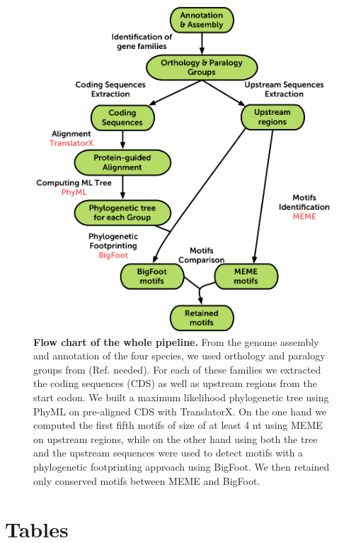 \documentclass[10pt]{article}
\begin{document}
\begin{figure}[!ht]
\begin{center}
\includegraphics{Figures/Pipeline.png}
\end{center}
\caption{
{\bf Flow chart of the whole pipeline.}  From the genome assembly and annotation of the four species, we used orthology and paralogy groups from (Ref. needed). For each of these families we extracted the coding sequences (CDS) as well as upstream regions from the start codon. We built a maximum likelihood phylogenetic tree using PhyML on pre-aligned CDS with TranslatorX. On the one hand we computed the first fifth motifs of size of at least 4 nt using MEME on upstream regions, while on the other hand using both the tree and the upstream sequences were used to detect motifs with a phylogenetic footprinting approach using BigFoot. We then retained only conserved motifs between MEME and BigFoot.
}
\label{fig:Pipeline}
\end{figure}


\section*{Tables}
\end{document}
